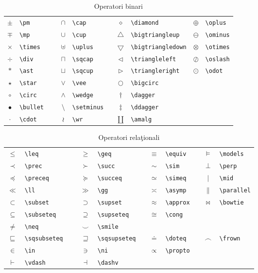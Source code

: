 \documentclass{article}
\begin{document}
\begin{table}
\begin{tabular}{clclclcl}
$\pm$    &\verb|\pm       |&$\cap$   &\verb|\cap    |&$\diamond$        &\verb|\diamond   |     &$\oplus$ &\verb|\oplus|\\
$\mp$    &\verb|\mp       |&$\cup$   &\verb|\cup    |&$\bigtriangleup$  &\verb|\bigtriangleup  |&$\ominus$&\verb|\ominus|\\
$\times$ &\verb|\times    |&$\uplus$ &\verb|\uplus  |&$\bigtriangledown$&\verb|\bigtriangledown|&$\otimes$&\verb|\otimes|\\
$\div$   &\verb|\div      |&$\sqcap$ &\verb|\sqcap  |&$\triangleleft$   &\verb|\triangleleft   |&$\oslash$&\verb|\oslash|\\
$\ast$   &\verb|\ast      |&$\sqcup$ &\verb|\sqcup  |&$\triangleright$  &\verb|\triangleright  |&$\odot$  &\verb|\odot|\\
$\star$  &\verb|\star     |&$\vee$   &\verb|\vee    |&$\bigcirc$        &\verb|\bigcirc|\\
$\circ$  &\verb|\circ     |&$\wedge$ &\verb|\wedge  |&$\dagger$         &\verb|\dagger|\\
$\bullet$&\verb|\bullet   |&$\setminus$&\verb|\setminus  |&$\ddagger$&\verb|\ddagger|\\
$\cdot$  &\verb|\cdot     |&$\wr      $&\verb|\wr  |&$\amalg$&\verb|\amalg|\\
\end{tabular}
\caption{Operatori binari}
\end{table}
\par

\begin{table}
\begin{tabular}{clclclcl}
$\leq$    &\verb|\leq       |&$\geq$   &\verb|\geq    |&$\equiv$        &\verb|\equiv   |     &$\models$ &\verb|\models|\\
$\prec$    &\verb|\prec       |&$\succ$   &\verb|\succ    |&$\sim$  &\verb|\sim  |&$\perp$&\verb|\perp|\\
$\preceq$ &\verb|\preceq    |&$\succeq$ &\verb|\succeq  |&$\simeq$&\verb|\simeq|&$\mid$&\verb|\mid|\\
$\ll$   &\verb|\ll      |&$\gg$ &\verb|\gg  |&$\asymp$   &\verb|\asymp   |&$\parallel$&\verb|\parallel|\\
$\subset$   &\verb|\subset      |&$\supset$ &\verb|\supset  |&$\approx$  &\verb|\approx  |&$\bowtie$  &\verb|\bowtie|\\
$\subseteq$  &\verb|\subseteq     |&$\supseteq$   &\verb|\supseteq    |&$\cong$        &\verb|\cong|\\
$\neq$  &\verb|\neq     |&$\smile$ &\verb|\smile  |\\
$\sqsubseteq$&\verb|\sqsubseteq   |&$\sqsupseteq$&\verb|\sqsupseteq  |&$\doteq$&\verb|\doteq|&$\frown$&\verb|\frown|\\
$\in$  &\verb|\in     |&$\ni      $&\verb|\ni  |&$\propto$&\verb|\propto|\\
$\vdash$&\verb|\vdash  |&$\dashv$&\verb|\dashv|\\
\end{tabular}
\caption{Operatori rela\c tionali}
\end{table}
\par
\end{document}
